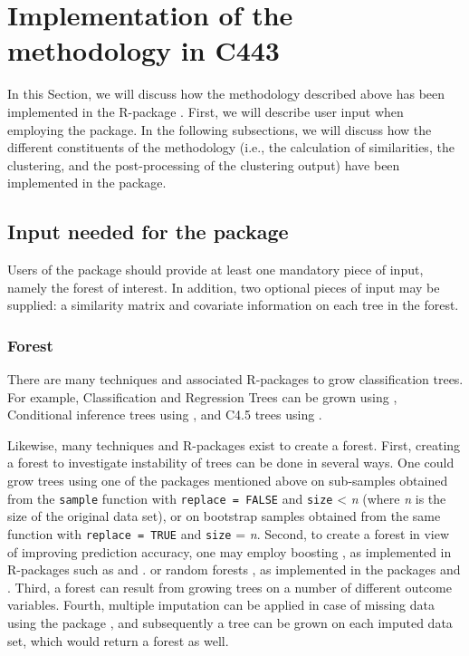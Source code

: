 \section{Implementation of the methodology in C443} \label{sec:implementation}
In this Section, we will discuss how the methodology described above has been implemented in the R-package . First, we will describe user input when employing the package. In the following subsections, we will discuss how the different constituents of the methodology (i.e., the calculation of similarities, the clustering, and the post-processing of the clustering output) have been implemented in the package.


\subsection{Input needed for the package}
Users of the package  should provide at least one mandatory piece of input, namely the forest of interest. In addition, two optional pieces of input may be supplied: a similarity matrix and covariate information on each tree in the forest.

\subsubsection{Forest}
There are many techniques and associated R-packages to grow classification trees. For example, Classification and Regression Trees \citep{Breiman1984} can be grown using  \citep{therneau2019}, Conditional inference trees \citep{Hothorna2006} using  \citep{Hothornb2015}, and C4.5 trees \citep{Quinlan1993} using  \citep{Hornik2009}. 


Likewise, many techniques and R-packages exist to create a forest. First, creating a forest to investigate instability of trees can be done in several ways. One could grow trees using one of the packages mentioned above on sub-samples obtained from the \texttt{sample} function with \texttt{replace = FALSE} and \texttt{size} < \textit{n} (where \textit{n} is the size of the original data set), or on bootstrap samples obtained from the same function with \texttt{replace = TRUE} and \texttt{size} = \textit{n}. Second, to create a forest in view of improving prediction accuracy, one may employ boosting \citep{Freund1997}, as implemented in R-packages such as  \citep{Alfaro2013} and  \citep{ridgeway2007}. or random forests \citep{Breiman2001}, as implemented in the packages  \citep{Liaw2002}  and  \citep{Wright2017}. Third, a forest can result from growing trees on a number of different outcome variables. Fourth, multiple imputation \citep{Rubin1987} can be applied in case of missing data using the  package \citep{VanBuuren2011}, and subsequently a tree can be grown on each imputed data set, which would return a forest as well.

